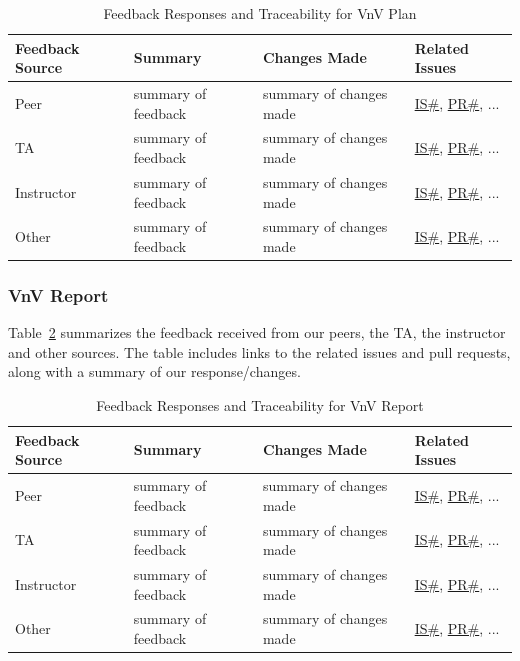 \documentclass{article}
\begin{document}
\begin{longtable}{|p{2cm}|p{4cm}|p{5cm}|p{4cm}|}
\caption{Feedback Responses and Traceability for VnV Plan}
\label{Tbl-VnVPlan}\\

\hline
\textbf{Feedback Source} & \textbf{Summary} & \textbf{Changes Made} & \textbf{Related Issues} \\ 
\hline
\endhead

Peer & summary of feedback & summary of changes made & \href{link}{IS\#}, \href{link}{PR\#}, ... \\
\hline
TA & summary of feedback & summary of changes made & \href{link}{IS\#}, \href{link}{PR\#}, ... \\
\hline
Instructor & summary of feedback & summary of changes made & \href{link}{IS\#}, \href{link}{PR\#}, ... \\
\hline
Other & summary of feedback & summary of changes made & \href{link}{IS\#}, \href{link}{PR\#}, ... \\
\hline
\end{longtable}

\subsubsection{VnV Report}

Table~\ref{Tbl-VnVReport} summarizes the feedback received from our peers, the
TA, the instructor and other sources.  The table includes links to the related
issues and pull requests, along with a summary of our response/changes.

\begin{longtable}{|p{2cm}|p{4cm}|p{5cm}|p{4cm}|}
\caption{Feedback Responses and Traceability for VnV Report}
\label{Tbl-VnVReport}\\

\hline
\textbf{Feedback Source} & \textbf{Summary} & \textbf{Changes Made} & \textbf{Related Issues} \\ 
\hline
\endhead

Peer & summary of feedback & summary of changes made & \href{link}{IS\#}, \href{link}{PR\#}, ... \\
\hline
TA & summary of feedback & summary of changes made & \href{link}{IS\#}, \href{link}{PR\#}, ... \\
\hline
Instructor & summary of feedback & summary of changes made & \href{link}{IS\#}, \href{link}{PR\#}, ... \\
\hline
Other & summary of feedback & summary of changes made & \href{link}{IS\#}, \href{link}{PR\#}, ... \\
\hline
\end{longtable}
\end{document}
